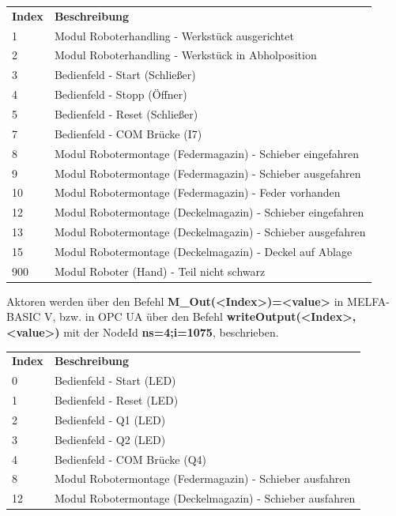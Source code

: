 \documentclass[11pt,a4paper,ngerman]{article}
\begin{document}
\begin{center}
	\setlength\extrarowheight{4pt}
	\small
	\begin{tabularx}{\textwidth}{|p{4cm}|X|}
		\hline
		\rowcolor{tublau}
		\multicolumn{2}{|c|}{\bf \color{white} \large Sensoren}\\
		\hline\hline
		\rowcolor{gray!80}
		\bf Index & \bf Beschreibung\\
		\hline\hline
		1 & Modul Roboterhandling - Werkstück ausgerichtet\\
		2 & Modul Roboterhandling - Werkstück in Abholposition\\
		3 & Bedienfeld - Start (Schließer)\\
		4 & Bedienfeld - Stopp (Öffner) \\
		5 & Bedienfeld - Reset (Schließer)\\
		7 & Bedienfeld - COM Brücke (I7)\\
		8 & Modul Robotermontage (Federmagazin) - Schieber eingefahren\\
		9 & Modul Robotermontage (Federmagazin) - Schieber ausgefahren\\
		10 & Modul Robotermontage (Federmagazin) - Feder vorhanden \\
		12 & Modul Robotermontage (Deckelmagazin) - Schieber eingefahren\\
		13 & Modul Robotermontage (Deckelmagazin) - Schieber ausgefahren\\
		15 & Modul Robotermontage (Deckelmagazin) - Deckel auf Ablage\\
		900 & Modul Roboter (Hand) - Teil nicht schwarz\\
		\hline
	\end{tabularx}
\end{center}
Aktoren werden über den Befehl \textbf{M\_Out(<Index>)=<value>} in MELFA-BASIC V, bzw. in OPC UA über den Befehl \textbf{writeOutput(<Index>,<value>)} mit der NodeId \textbf{ns=4;i=1075}, beschrieben.
\begin{center}
	\setlength\extrarowheight{4pt}
	\small
	\begin{tabularx}{\textwidth}{|p{4cm}|X|}
		\hline
		\rowcolor{tublau}
		\multicolumn{2}{|c|}{\bf \color{white} \large Aktoren}\\
		\hline\hline
		\rowcolor{gray!80}
		\bf Index & \bf Beschreibung\\
		\hline\hline
		0 & Bedienfeld - Start (LED)\\
		1 & Bedienfeld - Reset (LED)\\
		2 & Bedienfeld - Q1 (LED)\\
		3 & Bedienfeld - Q2 (LED)\\
		4 & Bedienfeld - COM Brücke (Q4)\\
		8 & Modul Robotermontage (Federmagazin) - Schieber ausfahren\\
		12 & Modul Robotermontage (Deckelmagazin) - Schieber ausfahren\\
		\hline
	\end{tabularx}
\end{center}
\end{document}
